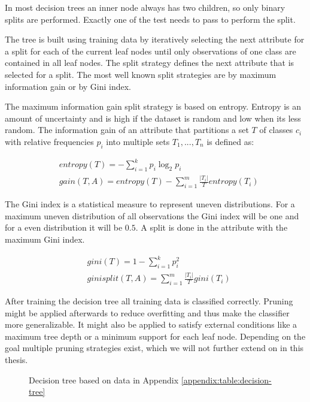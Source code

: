 \documentclass[pdftex,12pt,a4paper]{report}
\begin{document}
In most decision trees an inner node always has two children, so only binary splits are performed. Exactly one of the test needs to pass to perform the split.

The tree is built using training data by iteratively selecting the next attribute for a split for each of the current leaf nodes until only observations of one class are contained in all leaf nodes. The split strategy defines the next attribute that is selected for a split. The most well known split strategies are by maximum information gain or by Gini index.

The maximum information gain split strategy is based on entropy. Entropy is an amount of uncertainty and is high if the dataset is random and low when its less random. The information gain of an attribute that partitions a set $T$ of classes $c_i$ with relative frequencies $p_i$ into multiple sets $T_1, ..., T_n$ is defined as:

\begin{equation}
\begin{split}
	& entropy(T) = - \sum_{i=1}^{k} p_i \log_2 p_i \\	
	& gain(T,A) = entropy(T) - \sum_{i=1}^{m} \frac{|T_i|}{T} entropy(T_i)
\end{split}
\end{equation}

The Gini index is a statistical measure to represent uneven distributions. For a maximum uneven distribution of all observations the Gini index will be one and for a even distribution it will be $0.5$. A split is done in the attribute with the maximum Gini index.

\begin{equation}
\begin{split}
& gini(T) = 1 - \sum_{i=1}^{k} p_i^2 \\
& ginisplit(T,A) = \sum_{i=1}^{m} \frac{|T_i|}{T} gini(T_i) 
\end{split}
\end{equation}

After training the decision tree all training data is classified correctly. Pruning might be applied afterwards to reduce overfitting and thus make the classifier more generalizable. It might also be applied to satisfy external conditions like a maximum tree depth or a minimum support for each leaf node. Depending on the goal multiple pruning strategies exist, which we will not further extend on in this thesis.

\begin{figure}[h]
	\centering
	\begin{subfigure}[b]{0.65\textwidth}
		\centering
		
	\end{subfigure}
	\caption{Decision tree based on data in Appendix \ref{appendix:table:decision-tree}}
	\label{fig:basics-decision-tree}
\end{figure}
\end{document}
